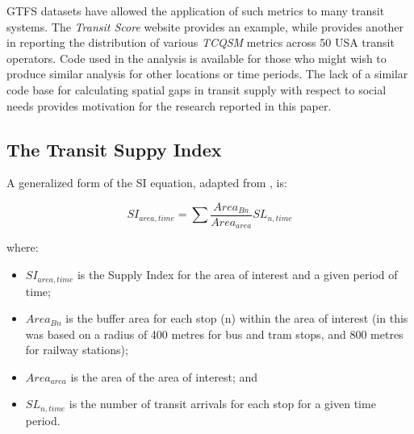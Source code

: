 \documentclass[preprint, 3p,
authoryear]{elsarticle} %
\begin{document}
GTFS datasets have allowed the application of such metrics to many
transit systems. The \emph{Transit Score} website provides an example,
while \citet{Wong:2013aa} provides another in reporting the distribution
of various \emph{TCQSM} metrics across 50 USA transit operators. Code
used in the \citet{Wong:2013aa} analysis is available for those who
might wish to produce similar analysis for other locations or time
periods. The lack of a similar code base for calculating spatial gaps in
transit supply with respect to social needs provides motivation for the
research reported in this paper.

\subsection{The Transit Suppy Index}\label{the-transit-suppy-index}

A generalized form of the SI equation, adapted from
\citet{currie2010identifying}, is:

\[SI_{area, time} = \sum{\frac{Area_{Bn}}{Area_{area}}SL_{n, time}}\]

where:

\begin{itemize}
\item
  \(SI_{area, time}\) is the Supply Index for the area of interest and a
  given period of time;
\item
  \(Area_{Bn}\) is the buffer area for each stop (n) within the area of
  interest (in \citet{currie2010identifying} this was based on a radius
  of 400 metres for bus and tram stops, and 800 metres for railway
  stations);
\item
  \(Area_{area}\) is the area of the area of interest; and
\item
  \(SL_{n,time}\) is the number of transit arrivals for each stop for a
  given time period.
\end{itemize}
\end{document}
